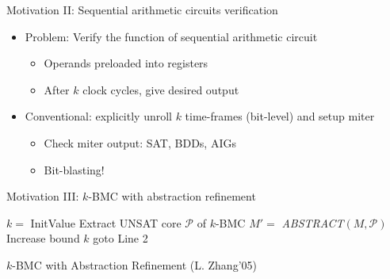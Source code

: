 \documentclass[xcolor=dvipsnames]{beamer}
\newcommand{\bi}{\begin{itemize}}
\newcommand{\ei}{\end{itemize}}
\begin{document}
\begin{frame}[label = motiv2]{\large{Motivation II: Sequential arithmetic circuits verification}}
\vspace{-0.1in}
\begin{figure}[H]
\end{figure}
\vspace{-0.2in}
\bi
\item Problem: Verify the function of sequential arithmetic circuit
	\bi
	\item Operands preloaded into registers
	\item After $k$ clock cycles, give desired output
	\ei
\item Conventional: explicitly unroll $k$ time-frames (bit-level) and setup miter
	\bi
	\item Check miter output: SAT, BDDs, AIGs
	\item Bit-blasting!
	\ei
\ei
\hyperlink{Moore}{}
\hyperlink{expSMPO}{}
\end{frame}
\begin{frame}[label = motiv3]{\large{Motivation III: $k$-BMC with abstraction refinement}}
\IncMargin{1em}
\begin{algorithm}[H]
\SetAlgoNoLine
  $k = $ InitValue\;
  {
  }
  {
	\alert{Extract UNSAT core $\mathcal P$ of $k$-BMC} \;
	$M' = $ \textit{ABSTRACT}$(M,\mathcal P)$\;
  }
  {
  }
  {
	Increase bound $k$\;
	goto Line 2\;
  }
\caption{$k$-BMC with Abstraction Refinement (L. Zhang'05)}
\end{algorithm}
\DecMargin{1em}
\hyperlink{refine}{}
\end{frame}
\end{document}
